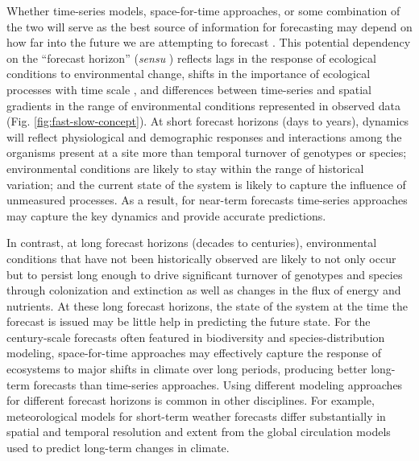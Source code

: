 \documentclass[11pt]{article}
\begin{document}
Whether time-series models, space-for-time approaches, or some combination of the two will serve as the best source of 
information for forecasting may depend on how far into the future we are attempting to forecast \citep{harris_forecasting_2018}. 
This potential dependency on the ``forecast horizon'' (\textit{sensu} \citealt{Hyndman2018})
reflects lags in the response of ecological conditions to environmental change, shifts in the importance of ecological processes with
time scale \citep{levin_1992,rosenzweig_1995}, and differences between time-series and spatial gradients in the range of 
environmental conditions represented in observed data (Fig. \ref{fig:fast-slow-concept}).
At short forecast horizons (days to years), dynamics will reflect physiological and demographic responses and interactions
among the organisms present at a site more than temporal turnover of genotypes or species; 
environmental conditions are likely to stay within the range of historical variation; 
and the current state of the system is likely to capture the influence of unmeasured processes. As a result, 
for near-term forecasts time-series approaches may capture the key dynamics and provide accurate predictions.

In contrast, at long forecast horizons (decades to centuries),  environmental conditions that have not been 
historically observed are likely to not only occur but to persist long enough to drive significant turnover of genotypes and species 
through colonization and extinction as well as changes in the flux of energy and nutrients.  
At these long forecast horizons, the state of the system at the time the forecast is issued may be 
little help in predicting the future state. For the century-scale forecasts often featured in biodiversity and 
species-distribution modeling, space-for-time approaches may effectively capture the response of ecosystems to major shifts 
in climate over long periods, producing better long-term forecasts than time-series approaches. 
Using different modeling approaches for different forecast horizons is common in other disciplines.
For example, meteorological models for short-term weather forecasts differ substantially in spatial
and temporal resolution and extent from the global circulation models used to predict long-term changes
in climate.
\end{document}
